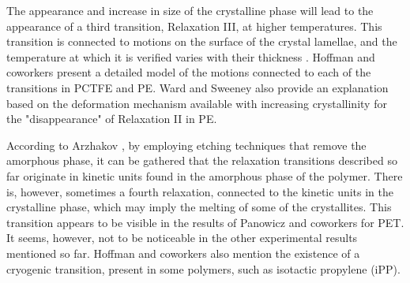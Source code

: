 The appearance and increase in size of the crystalline phase will lead to the appearance of a third transition, Relaxation III, at higher temperatures.
This transition is connected to motions on the surface of the crystal lamellae, and the temperature at which it is verified varies with their thickness \citep{khannaDynamicMechanicalRelaxations1985, hoffmanAnalysisRelaxationsPolychlorotrifluoroethylene2007}.
Hoffman and coworkers \citep{hoffmanAnalysisRelaxationsPolychlorotrifluoroethylene2007} present a detailed model of the motions connected to each of the transitions in PCTFE and PE.
Ward and Sweeney \citep{wardIntroductionMechanicalProperties2004} also provide an explanation based on the deformation mechanism available with increasing crystallinity for the "disappearance" of Relaxation II in PE.

According to Arzhakov \citep{arzhakovRelaxationPhysicalMechanical2019}, by employing etching techniques that remove the amorphous phase, it can be gathered that the relaxation transitions described so far originate in kinetic units found in the amorphous phase of the polymer.
There is, however, sometimes a fourth relaxation, connected to the kinetic units in the crystalline phase, which may imply the melting of some of the crystallites.
This transition appears to be visible in the results of Panowicz and coworkers \citep{panowiczPropertiesPolyethyleneTerephthalate2021} for PET.
It seems, however, not to be noticeable in the other experimental results mentioned so far.
Hoffman and coworkers \citep{hoffmanAnalysisRelaxationsPolychlorotrifluoroethylene2007} also mention the existence of a cryogenic transition, present in some polymers, such as isotactic propylene (iPP).

